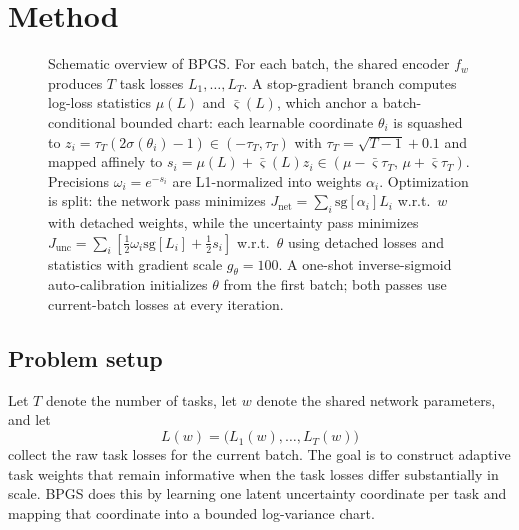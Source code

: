 \section{Method}

\begin{figure}[t]\centering

\caption{Schematic overview of BPGS. For each batch, the shared encoder $f_w$ produces $T$ task
losses $L_1,\dots,L_T$. A stop-gradient branch computes log-loss statistics $\mu(L)$ and
$\bar\varsigma(L)$, which anchor a batch-conditional bounded chart: each learnable coordinate
$\theta_i$ is squashed to $z_i=\tau_T(2\sigma(\theta_i)-1)\in(-\tau_T,\tau_T)$ with
$\tau_T=\sqrt{T-1}+0.1$ and mapped affinely to
$s_i=\mu(L)+\bar\varsigma(L)z_i\in(\mu-\bar\varsigma\tau_T,\,\mu+\bar\varsigma\tau_T)$.
Precisions $\omega_i=e^{-s_i}$ are L1-normalized into weights $\alpha_i$. Optimization is split:
the network pass minimizes $J_{\mathrm{net}}=\sum_i\mathrm{sg}[\alpha_i]L_i$ w.r.t.\ $w$ with
detached weights, while the uncertainty pass minimizes
$J_{\mathrm{unc}}=\sum_i[\tfrac12\omega_i\mathrm{sg}[L_i]+\tfrac12 s_i]$ w.r.t.\ $\theta$ using
detached losses and statistics with gradient scale $g_\theta=100$. A one-shot inverse-sigmoid
auto-calibration initializes $\theta$ from the first batch; both passes use current-batch losses
at every iteration.}
\label{fig:bpgs_overview}
\end{figure}

\subsection{Problem setup}
Let $T$ denote the number of tasks, let $w$ denote the shared network parameters, and let
\begin{equation}
L(w) = \bigl(L_1(w), \dots, L_T(w)\bigr)
\end{equation}
collect the raw task losses for the current batch. The goal is to construct adaptive task weights that remain informative when the task losses differ substantially in scale. BPGS does this by learning one latent uncertainty coordinate per task and mapping that coordinate into a bounded log-variance chart.


